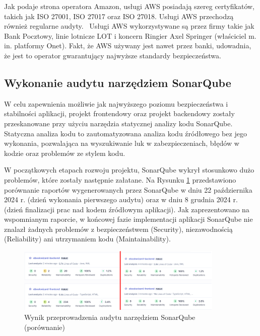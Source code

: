 Jak podaje strona operatora Amazon, usługi AWS posiadają szereg certyfikatów, takich jak ISO 27001, ISO 27017 oraz ISO 27018. Usługi AWS przechodzą również regularne audyty.~\cite{aws_compliance} Usługi AWS wykorzystywane są przez firmy takie jak Bank Pocztowy, linie lotnicze LOT i koncern Ringier Axel Springer (właściciel m. in. platformy Onet). \cite{aws_case_Studies} Fakt, że AWS używany jest nawet przez banki, udowadnia, że jest to operator gwarantujący najwyższe standardy bezpieczeństwa.

\subsection{Wykonanie audytu narzędziem SonarQube}

W celu zapewnienia możliwie jak najwyższego poziomu bezpieczeństwa i stabilności aplikacji, projekt frontendowy oraz projekt backendowy zostały przeskanowane przy użyciu narzędzia statycznej analizy kodu SonarQube. Statyczna analiza kodu to zautomatyzowana analiza kodu źródłowego bez jego wykonania, pozwalająca na wyszukiwanie luk w zabezpieczeniach, błędów w kodzie oraz problemów ze stylem kodu. \cite{sonarqube}

W początkowych etapach rozwoju projektu, SonarQube wykrył stosunkowo dużo problemów, które zostały następnie załatane. Na Rysunku \ref{fig:sonarqube} przedstawiono porównanie raportów wygenerowanych przez SonarQube w dniu 22 października 2024 r. (dzień wykonania pierwszego audytu) oraz w dniu 8 grudnia 2024 r. (dzień finalizacji prac nad kodem źródłowym aplikacji). Jak zaprezentowano na wspomnianym raporcie, w końcowej fazie implementacji aplikacji SonarQube nie znalazł żadnych problemów z bezpieczeństwem (Security), niezawodnością (Reliability) ani utrzymaniem kodu (Maintainability).

\begin{figure}[h]
    \centering
    \setlength{\fboxsep}{0pt}
    \setlength{\fboxrule}{0.4pt}
    \includegraphics[width=0.88\textwidth]{chap6/sonarqube.png}
    \caption{Wynik przeprowadzenia audytu narzędziem SonarQube (porównanie)}
    \label{fig:sonarqube}
\end{figure}